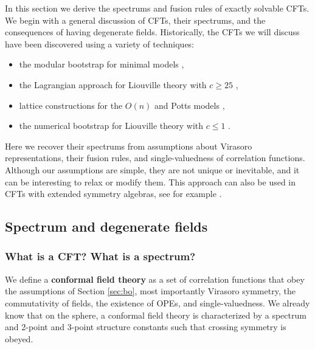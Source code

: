 \documentclass[12pt, a4paper]{article}
\newcommand{\myindex}[1]{\textbf{\boldmath #1}}
\theoremstyle{break}
\begin{document}
In this section we derive the spectrums and fusion rules of exactly solvable CFTs. We begin with a general discussion of CFTs, their spectrums, and the consequences of having degenerate fields. Historically, the CFTs we will discuss have been discovered using a variety of techniques: 
\begin{itemize}
 \item the modular bootstrap for minimal models \cite{fms97},
 \item the Lagrangian approach for Liouville theory with $c\geq 25$ \cite{zz95},
 \item lattice constructions for the $O(n)$ and Potts models \cite{fsz87},
 \item the numerical bootstrap for Liouville theory with $c\leq 1$ \cite{rs15}.
\end{itemize}
Here we recover their spectrums from assumptions about Virasoro representations, their fusion rules, and single-valuedness of correlation functions. Although our assumptions are simple, they are not unique or inevitable, and it can be interesting to relax or modify them. This approach can also be used in CFTs with extended symmetry algebras, see for example \cite{bp24}.

\subsection{Spectrum and degenerate fields}

\subsubsection{What is a CFT? What is a spectrum?}

We define a \myindex{conformal field theory} as a set of correlation functions that obey the assumptions of Section \ref{sec:bo}, most importantly Virasoro symmetry, the commutativity of fields, the existence of OPEs, and single-valuedness. We already know that on the sphere, a conformal field theory is characterized by a spectrum and 2-point and 3-point structure constants such that crossing symmetry is obeyed.
\end{document}
